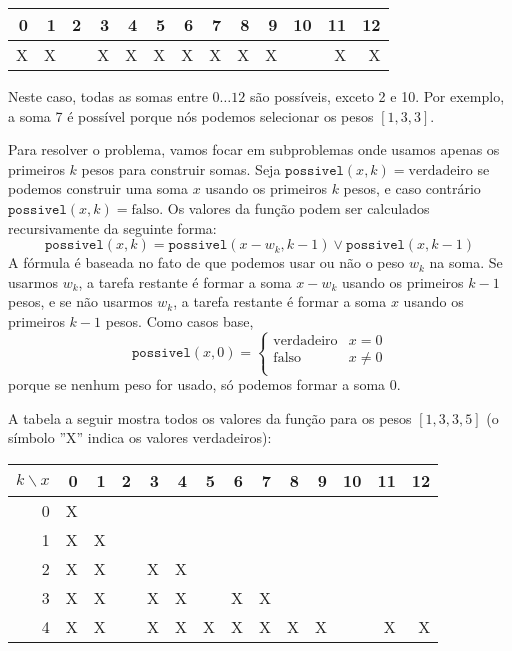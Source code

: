 \begin{center}
\begin{tabular}{rrrrrrrrrrrrr}
 0 & 1 & 2 & 3 & 4 & 5 & 6 & 7 & 8 & 9 & 10 & 11 & 12 \\
\hline
 X & X & & X & X & X & X & X & X & X & & X & X \\
\end{tabular}
\end{center}

Neste caso, todas as somas entre $0 \ldots 12$
são possíveis, exceto 2 e 10.
Por exemplo, a soma 7 é possível porque nós
podemos selecionar os pesos $[1,3,3]$.

Para resolver o problema, vamos focar em subproblemas
onde usamos apenas os primeiros $k$ pesos
para construir somas.
Seja $\texttt{possivel}(x,k)=\textrm{verdadeiro}$ se
podemos construir uma soma $x$
usando os primeiros $k$ pesos,
e caso contrário $\texttt{possivel}(x,k)=\textrm{falso}$.
Os valores da função podem ser calculados recursivamente
da seguinte forma:
\[ \texttt{possivel}(x,k) = \texttt{possivel}(x-w_k,k-1) \lor \texttt{possivel}(x,k-1) \]
A fórmula é baseada no fato de que podemos
usar ou não o peso $w_k$ na soma.
Se usarmos $w_k$, a tarefa restante é
formar a soma $x-w_k$ usando os primeiros $k-1$ pesos,
e se não usarmos $w_k$,
a tarefa restante é formar a soma $x$
usando os primeiros $k-1$ pesos.
Como casos base,
\begin{equation*}
    \texttt{possivel}(x,0) = \begin{cases}
               \textrm{verdadeiro}    & x = 0\\
               \textrm{falso}   & x \neq 0 \\
           \end{cases}
\end{equation*}
porque se nenhum peso for usado,
só podemos formar a soma 0.

A tabela a seguir mostra todos os valores da função
para os pesos $[1,3,3,5]$ (o símbolo ''X''
indica os valores verdadeiros):

\begin{center}
\begin{tabular}{r|rrrrrrrrrrrrr}
$k \backslash x$ & 0 & 1 & 2 & 3 & 4 & 5 & 6 & 7 & 8 & 9 & 10 & 11 & 12 \\
\hline
 0 & X & \\
 1 & X & X \\
 2 & X & X & & X & X \\
 3 & X & X & & X & X & & X & X \\
 4 & X & X & & X & X & X & X & X & X & X & & X & X \\
\end{tabular}
\end{center}

